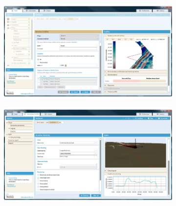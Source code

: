 \begin{figure}[!ht]
    \centering
    \caption{Interface gráfica do SAGE Profile.}\label{fig:sageprofile}
    \begin{subfigure}[t]{0.49\textwidth}
        \centering
        \includegraphics[width=\textwidth]{imagens/sage_profile_1}
    \end{subfigure}
    \hfill
    \begin{subfigure}[t]{0.49\textwidth}
        \centering
        \includegraphics[width=\textwidth]{imagens/sage_profile_2}
    \end{subfigure}
\end{figure}




